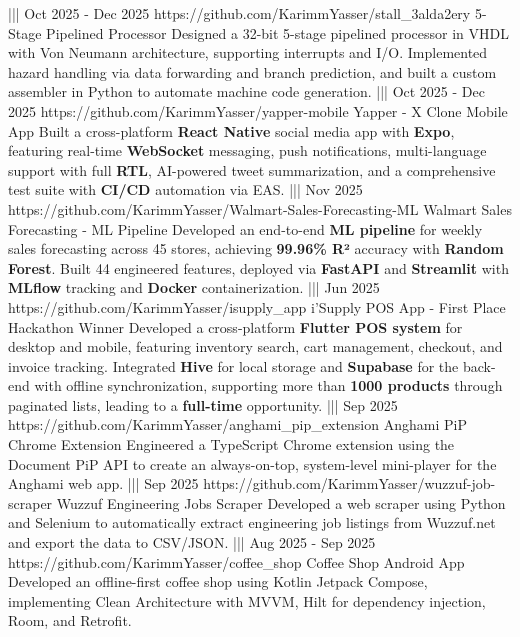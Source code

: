 {    |||
    {Oct 2025 - Dec 2025}%
    {https://github.com/KarimmYasser/stall_3alda2ery}%
    {5-Stage Pipelined Processor}%
    {Designed a 32-bit 5-stage pipelined processor in VHDL with Von Neumann architecture, supporting interrupts and I/O. Implemented hazard handling via data forwarding and branch prediction, and built a custom assembler in Python to automate machine code generation.}%
    |||
    {Oct 2025 - Dec 2025}%
    {https://github.com/KarimmYasser/yapper-mobile}%
    {Yapper - X Clone Mobile App}%
    {Built a cross-platform \textbf{React Native} social media app with \textbf{Expo}, featuring real-time \textbf{WebSocket} messaging, push notifications, multi-language support with full \textbf{RTL}, AI-powered tweet summarization, and a comprehensive test suite with \textbf{CI/CD} automation via EAS.}%
    |||
    {Nov 2025}%
    {https://github.com/KarimmYasser/Walmart-Sales-Forecasting-ML}%
    {Walmart Sales Forecasting - ML Pipeline}%
    {Developed an end-to-end \textbf{ML pipeline} for weekly sales forecasting across 45 stores, achieving \textbf{99.96\% R²} accuracy with \textbf{Random Forest}. Built 44 engineered features, deployed via \textbf{FastAPI} and \textbf{Streamlit} with \textbf{MLflow} tracking and \textbf{Docker} containerization.}%
    |||
    {Jun 2025}%
    {https://github.com/KarimmYasser/isupply_app}%
    {i'Supply POS App - First Place Hackathon Winner}%
    {Developed a cross-platform \textbf{Flutter POS system} for desktop and mobile, featuring inventory search, cart management, checkout, and invoice tracking. Integrated \textbf{Hive} for local storage and \textbf{Supabase} for the back-end with offline synchronization, supporting more than \textbf{1000 products} through paginated lists, leading to a \textbf{full-time} opportunity.}%
    |||
    {Sep 2025}%
    {https://github.com/KarimmYasser/anghami_pip_extension}%
    {Anghami PiP Chrome Extension}%
    {Engineered a TypeScript Chrome extension using the Document PiP API to create an always-on-top, system-level mini-player for the Anghami web app.}%
    |||
    {Sep 2025}%
    {https://github.com/KarimmYasser/wuzzuf-job-scraper}%
    {Wuzzuf Engineering Jobs Scraper}%
    {Developed a web scraper using Python and Selenium to automatically extract engineering job listings from Wuzzuf.net and export the data to CSV/JSON.}%
    |||
    {Aug 2025 - Sep 2025}%
    {https://github.com/KarimmYasser/coffee_shop}%
    {Coffee Shop Android App}%
    {Developed an offline-first coffee shop using Kotlin Jetpack Compose, implementing Clean Architecture with MVVM, Hilt for dependency injection, Room, and Retrofit.}%
}
